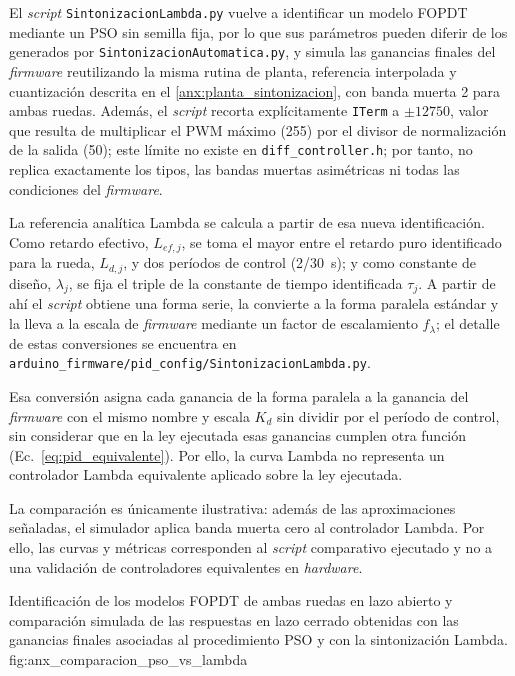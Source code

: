\begin{appendices}
El \textit{script} \texttt{SintonizacionLambda.py} vuelve a identificar un modelo FOPDT mediante un PSO sin semilla fija, por lo que sus parámetros pueden diferir de los generados por \texttt{SintonizacionAutomatica.py}, y simula las ganancias finales del \textit{firmware} reutilizando la misma rutina de planta, referencia interpolada y cuantización descrita en el \ref{anx:planta_sintonizacion}, con banda muerta 2 para ambas ruedas. Además, el \textit{script} recorta explícitamente \texttt{ITerm} a $\pm12750$, valor que resulta de multiplicar el PWM máximo (255) por el divisor de normalización de la salida (50); este límite no existe en \texttt{diff\_controller.h}; por tanto, no replica exactamente los tipos, las bandas muertas asimétricas ni todas las condiciones del \textit{firmware}.

La referencia analítica Lambda se calcula a partir de esa nueva identificación. Como retardo efectivo, $L_{ef,j}$, se toma el mayor entre el retardo puro identificado para la rueda, $L_{d,j}$, y dos períodos de control (2/30~s); y como constante de diseño, $\lambda_j$, se fija el triple de la constante de tiempo identificada $\tau_j$. A partir de ahí el \textit{script} obtiene una forma serie, la convierte a la forma paralela estándar y la lleva a la escala de \textit{firmware} mediante un factor de escalamiento $f_{\lambda}$; el detalle de estas conversiones se encuentra en \texttt{arduino\_\allowbreak{}firmware/\allowbreak{}pid\_\allowbreak{}config/\allowbreak{}SintonizacionLambda.\allowbreak{}py}.

Esa conversión asigna cada ganancia de la forma paralela a la ganancia del
\textit{firmware} con el mismo nombre y escala $K_d$ sin dividir por el período de
control, sin considerar que en la ley ejecutada esas ganancias cumplen otra
función (Ec.~\eqref{eq:pid_equivalente}). Por ello, la curva Lambda no
representa un controlador Lambda equivalente aplicado sobre la ley ejecutada.

La comparación es únicamente ilustrativa: además de las aproximaciones
señaladas, el simulador aplica banda muerta cero al controlador Lambda. Por
ello, las curvas y métricas corresponden al \textit{script} comparativo ejecutado y no
a una validación de controladores equivalentes en \textit{hardware}.

{Identificación de los modelos FOPDT de ambas ruedas en lazo abierto y comparación simulada de las respuestas en lazo cerrado obtenidas con las ganancias finales asociadas al procedimiento PSO y con la sintonización Lambda.}
{fig:anx_comparacion_pso_vs_lambda}


\end{appendices}
